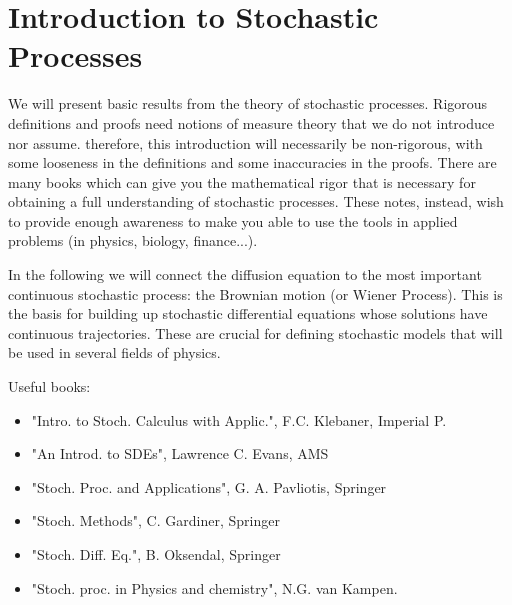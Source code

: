 
\section{Introduction to Stochastic Processes}
We will present basic results from the theory of stochastic processes. Rigorous
definitions and proofs need notions of measure theory that we do not introduce
nor assume. therefore, this introduction will necessarily be non-rigorous, with
some looseness in the definitions and some inaccuracies in the proofs. There are
many books which can give you the mathematical rigor that is necessary for
obtaining a full understanding of stochastic processes. These notes, instead,
wish to provide enough awareness to make you able to use the tools in applied
problems (in physics, biology, finance...).

In the following we will connect the diffusion equation to the most important
continuous stochastic process: the Brownian motion (or Wiener Process). This is
the basis for building up stochastic differential equations whose solutions have
continuous trajectories. These are crucial for defining stochastic models that
will be used in several fields of physics.

Useful books:
\begin{itemize}
  \item "Intro. to Stoch. Calculus with Applic.", F.C. Klebaner, Imperial P.
  \item "An Introd. to SDEs", Lawrence C. Evans, AMS
  \item "Stoch. Proc. and Applications", G. A. Pavliotis, Springer
  \item "Stoch. Methods", C. Gardiner, Springer
  \item "Stoch. Diff. Eq.", B. Oksendal, Springer
  \item "Stoch. proc. in Physics and chemistry", N.G. van Kampen.
\end{itemize}

